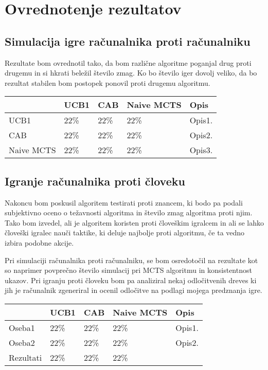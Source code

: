 \documentclass[a4paper, 12pt]{book}
\begin{document}
\chapter{Ovrednotenje rezultatov}

\section{Simulacija igre računalnika proti računalniku}
Rezultate bom ovrednotil tako, da bom različne algoritme poganjal drug proti drugemu in si hkrati beležil število zmag.
Ko bo število iger dovolj veliko, da bo rezultat stabilen bom postopek ponovil proti drugemu algoritmu.
\begin{center}
	\begin{tabular}{ | l | l | l | l | p{5cm} |}
		\hline
		& UCB1 & CAB & Naive MCTS &Opis \\ \hline
		UCB1 & 22\% & 22\% & 22\% & Opis1. \\ \hline
		CAB & 22\%  & 22\%  & 22\%  &Opis2. \\ \hline
		Naive MCTS & 22\%  &22\%  & 22\%  & Opis3. \\ \hline
		
	\end{tabular}
\end{center}
\section{Igranje računalnika proti človeku}
Nakoncu bom poskusil algoritem testirati proti znancem, ki bodo pa podali subjektivno oceno o težavnosti algoritma in število zmag algoritma proti njim.
Tako bom izvedel, ali je algoritem koristen proti človeškim igralcem in ali se lahko človeški igralec nauči taktike, ki deluje najbolje proti algoritmu, če ta vedno izbira podobne akcije.


Pri simulaciji računalnika proti računalniku, se bom osredotočil na rezultate kot so naprimer povprečno število simulacij pri MCTS algoritmu in konsistentnost ukazov.
Pri igranju proti človeku bom pa analiziral nekaj odločitvenih dreves ki jih je računalnik zgeneriral in ocenil odločitve na podlagi mojega predznanja igre.

\begin{center}
	\begin{tabular}{ | l | l | l | l | p{5cm} |}
		\hline
		& UCB1 & CAB & Naive MCTS &Opis \\ \hline
		Oseba1 &22\% &22\%  & 22\%  & Opis1. \\ \hline
		Oseba2 & 22\% & 22\%  & 22\%  &Opis2. \\ \hline \hline
		Rezultati & 22\%  & 22\%  &22\%  & \\
		\hline
	\end{tabular}
\end{center}
\end{document}

